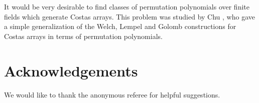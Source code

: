 \documentclass[10pt]{amsart}
\begin{document}
It would be very desirable to find classes of permutation
polynomials  over finite fields which generate Costas arrays. This
problem was studied by Chu \cite{MR1992961}, who gave a simple
generalization of  the Welch, Lempel and Golomb constructions for
Costas arrays in terms of permutation polynomials.

\section*{Acknowledgements} We would like to thank the anonymous
referee for helpful suggestions.



\end{document}
